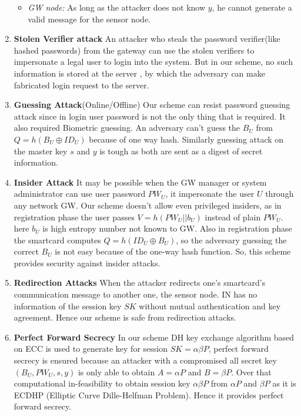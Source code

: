\documentclass[a4paper,12pt]{report}
\begin{document}
\begin{enumerate}
\begin{itemize}
\item \textit{GW node:} As long as the attacker does not know $y$,
he cannot generate a valid message for the sensor node.
\end{itemize}

\item \textbf{Stolen Verifier attack}
An attacker who steals the password verifier(like hashed passwords)
from the gateway can use the stolen verifiers to impersonate a legal
user to login into the system. But in our scheme, no such
information is stored at the server , by which the adversary can
make fabricated login request to the server.

\item \textbf{Guessing Attack}(Online/Offline)
Our scheme can resist password guessing attack since in login user
password is not the only thing that is required. It also required
Biometric guessing. An adversary can't guess the $B_U$ from $Q =
h(B_{U} \oplus ID_{U})$ because of one way hash. Similarly guessing
attack on the master key $s$ and $y$ is tough as both are sent as a
digest of secret information.

\item \textbf{Insider Attack}
It may be possible when the GW manager or system administrator can
use user password $PW_{U}$, it impersonate the user $U$ through any
network GW. Our scheme doesn't allow even privileged insiders, as in
registration phase the user passes $V = h(PW_{U}||b_{U})$ instead of
plain $PW_{U}$. here $b_{U}$ is high entropy number not known to GW.
Also in registration phase the smartcard computes $Q = h(ID_{U}
\oplus B_{U})$, so the adversary guessing the correct $B_{U}$ is not
easy because of the one-way hash function. So, this scheme provides
security against insider attacks.

\item \textbf{Redirection Attacks}
When the attacker redirects one's smartcard's communication message
to another one, the sensor node. IN has no information of the
session key $SK$ without mutual authentication and key agreement.
Hence our scheme is safe from redirection attacks.

\item \textbf{Perfect Forward Secrecy}
In our scheme DH key exchange algorithm based on ECC is used to
generate key for session $SK=\alpha\beta P$, perfect forward secrecy
is ensured because an attacker with a compromised all secret key
$(B_{U}, PW_{U}, s, y)$ is only able to obtain $A= \alpha P$ and $B=
\beta P$. Over that computational in-feasibility to obtain session
key $\alpha\beta P$ from $\alpha P$ and $\beta P$ as it is ECDHP
(Elliptic Curve Dille-Helfman Problem). Hence it provides perfect
forward secrecy.


\end{enumerate}
\end{document}
